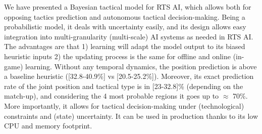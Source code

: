 We have presented a Bayesian tactical model for RTS AI, which allows both for opposing tactics prediction and autonomous tactical decision-making. Being a probabilistic model, it deals with uncertainty easily, and its design allows easy integration into multi-granularity (multi-scale) AI systems as needed in RTS AI. The advantages are that 1) learning will adapt the model output to its biased heuristic inputs %
2) the updating process is the same for offline and online (in-game) learning. 
Without any temporal dynamics, the position prediction is above a baseline heuristic ([32.8-40.9\%] vs [20.5-25.2\%]). Moreover, its exact prediction rate of the joint position and tactical type is in [23-32.8]\% (depending on the match-up), and considering the 4 most probable regions it goes up to $\approx$ 70\%. More importantly, it allows for tactical decision-making under (technological) constraints and (state) uncertainty. It can be used in production thanks to its low CPU and memory footprint. %

